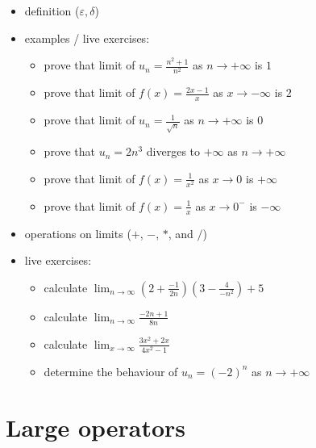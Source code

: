 \begin{itemize}
\tightlist
\item
  definition (\(\varepsilon, \delta\))
\item
  examples / live exercises:

  \begin{itemize}
  \tightlist
  \item
    prove that limit of \(u_n = \frac{n^2+1}{n^2}\) as \(n \to +\infty\)
    is \(1\)
  \item
    prove that limit of \(f(x) = \frac{2x-1}{x}\) as \(x \to -\infty\)
    is \(2\)
  \item
    prove that limit of \(u_n = \frac{1}{\sqrt{n}}\) as
    \(n \to +\infty\) is \(0\)
  \item
    prove that \(u_n = 2n^3\) diverges to \(+\infty\) as
    \(n \to +\infty\)
  \item
    prove that limit of \(f(x) = \frac{1}{x^2}\) as \(x \to 0\) is
    \(+\infty\)
  \item
    prove that limit of \(f(x) = \frac{1}{x}\) as \(x \to 0^-\) is
    \(-\infty\)
  \end{itemize}
\item
  operations on limits (\(+\), \(-\), \(*\), and \(/\))
\item
  live exercises:

  \begin{itemize}
  \tightlist
  \item
    calculate
    \(\lim_{n\to \infty} \left(2+\frac{-1}{2n}\right)\left(3-\frac{4}{-n^2}\right)+5\)
  \item
    calculate \(\lim_{n\to \infty} \frac{-2n+1}{8n}\)
  \item
    calculate \(\lim_{x\to \infty} \frac{3x^2 + 2x}{4x^2 - 1}\)
  \item
    determine the behaviour of \(u_n = (-2)^n\) as \(n \to +\infty\)
  \end{itemize}
\end{itemize}

\hypertarget{large-operators}{%
\section{Large operators}\label{large-operators}}

